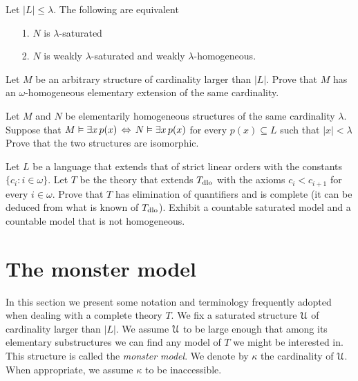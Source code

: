 \begin{corollary}\label{saturo=universaledebolmenteomogeneo}
Let $|L|\le\lambda$. The following are equivalent\nobreak
\begin{itemize}
\item[1.] $N$ is $\lambda\mbox{-}$saturated
\item[2.] $N$ is weakly $\lambda\mbox{-}$saturated and weakly $\lambda\mbox{-}$homogeneous.
\end{itemize}
\end{corollary}

\begin{exercise}\label{ex_omega_homogeneous_same_card}
Let $M$ be an arbitrary structure of cardinality larger than $|L|$.
Prove that $M$ has an $\omega\mbox{-}$homogeneous elementary extension of the same cardinality. 
\end{exercise}

\begin{exercise}
Let $M$ and $N$ be elementarily homogeneous structures of the same cardinality $\lambda$. 
Suppose that $M\vDash\exists x\, p(x)\,\Leftrightarrow\,N\vDash\exists x\, p(x)$ for every $p(x)\subseteq L$ such that $|x|<\lambda$
Prove that the two structures are isomorphic. 
\end{exercise}

\begin{exercise}\label{vaughtesempio}
Let $L$ be a language that extends that of strict linear orders with the constants $\{c_i: i\in\omega\}$.
Let $T$ be the theory that extends $T_{\rm dlo}$ with the axioms $c_i<c_{i+1}$ for every  $i\in\omega$. Prove that $T$ has elimination of quantifiers and is complete (it can be deduced from what is known of $T_{\rm dlo}$). 
Exhibit a countable saturated model and a countable model that is not homogeneous. 
\end{exercise}

\section{The monster model}\label{monster}
\label{compattezzasaturazione}

In this section we present some notation and terminology frequently adopted when dealing with a complete theory $T$.
We fix a saturated structure $\EuScript U$ of cardinality larger than $|L|$.
We assume $\EuScript U$ to be large enough that among its elementary substructures we can find any model of $T$ we might be interested in.
This structure is called the \emph{monster model}.
We denote by $\kappa$ the cardinality of $\EuScript U$.
When appropriate, we assume $\kappa$ to be inaccessible. 


